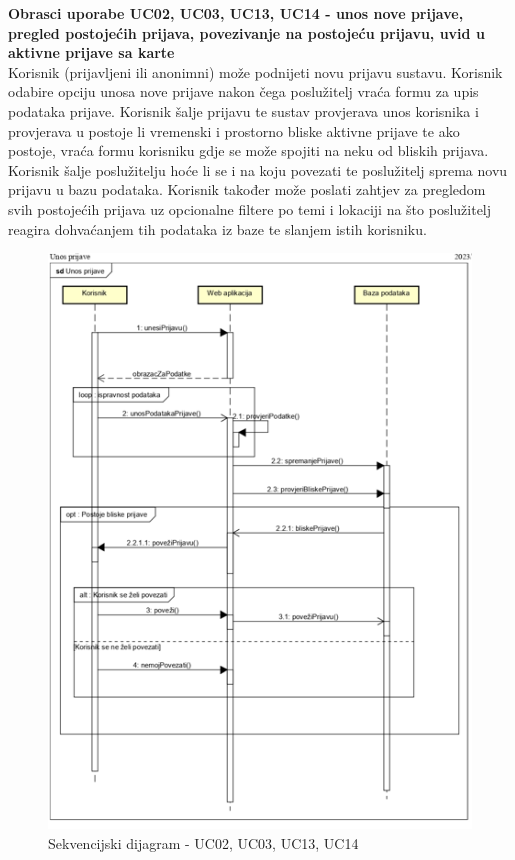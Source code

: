 				\textbf{Obrasci uporabe UC02, UC03, UC13, UC14 - unos nove prijave, pregled postojećih prijava, povezivanje na postojeću prijavu, uvid u aktivne prijave sa karte}\\
				Korisnik (prijavljeni ili anonimni) može podnijeti novu prijavu sustavu. Korisnik odabire opciju unosa nove prijave nakon čega poslužitelj vraća formu za upis podataka prijave. 
				Korisnik šalje prijavu te sustav provjerava unos korisnika i provjerava u postoje li vremenski i prostorno bliske aktivne prijave te ako postoje, vraća formu korisniku gdje se može spojiti na neku od bliskih prijava. 
				Korisnik šalje poslužitelju hoće li se i na koju povezati te poslužitelj sprema novu prijavu u bazu podataka. Korisnik također može poslati zahtjev za pregledom svih postojećih prijava uz opcionalne filtere po temi i lokaciji na što poslužitelj reagira dohvaćanjem tih podataka iz baze te slanjem istih korisniku. \\
				
				\begin{figure}[H]
			\includegraphics[scale=1.0]{slike/unosPrijave.PNG} %
			\centering
			\caption{Sekvencijski dijagram - UC02, UC03, UC13, UC14}
		\end{figure}
				

